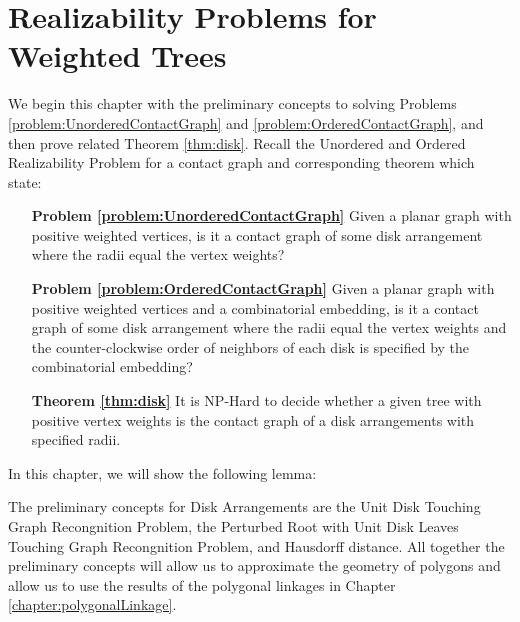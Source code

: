 \chapter{Realizability Problems for Weighted Trees}\label{chp:disk}

We begin this chapter with the preliminary concepts to solving Problems \ref{problem:UnorderedContactGraph} and \ref{problem:OrderedContactGraph}, and then prove related Theorem \ref{thm:disk}.  
Recall the Unordered and Ordered Realizability Problem for a contact graph  and corresponding theorem which state:

\begin{itemize}
\item[\textbf{Problem \ref{problem:UnorderedContactGraph}}] Given a planar graph with positive weighted vertices, is it a contact graph of some disk arrangement where the radii equal the vertex weights?
\item[\textbf{Problem \ref{problem:OrderedContactGraph}}] Given a planar graph with positive weighted vertices and a combinatorial embedding, is it a contact graph of some disk arrangement where the radii equal the vertex weights and the counter-clockwise order of neighbors of each disk is specified by the combinatorial embedding?
\item[\textbf{Theorem \ref{thm:disk}}] It is NP-Hard to decide whether a given tree with positive vertex weights
is the contact graph of a disk arrangements with specified radii.
\end{itemize}

In this chapter, we will show the following lemma:
  
The preliminary concepts for Disk Arrangements are the Unit Disk Touching Graph Recongnition Problem, the Perturbed Root with Unit Disk Leaves Touching Graph Recongnition Problem, and Hausdorff distance.  
All together the preliminary concepts will allow us to approximate the geometry of polygons and allow us to use the results of the polygonal linkages in Chapter \ref{chapter:polygonalLinkage}.
